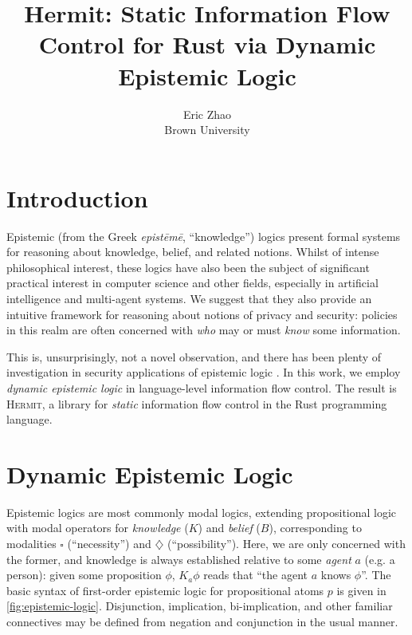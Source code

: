 \documentclass[letterpaper,twocolumn,10pt]{article}
\newcommand{\Hermit}{\textsc{Hermit}}
\begin{document}
\ActivateVerbatimLigatures

\date{}

\title{\Large \bf Hermit: Static Information Flow Control for Rust via Dynamic Epistemic Logic}

\author{
  {\rm Eric Zhao} \\
  Brown University
}

\maketitle

\section{Introduction}

Epistemic (from the Greek \emph{epistēmē}, ``knowledge'') logics present formal systems for reasoning about knowledge,
belief, and related notions. Whilst of intense philosophical interest, these logics have also been
the subject of significant practical interest in computer science and other fields, especially in
artificial intelligence and multi-agent systems. We suggest that they also provide an intuitive
framework for reasoning about notions of privacy and security: policies in this realm are often
concerned with \emph{who} may or must \emph{know} some information.

This is, unsurprisingly, not a novel observation, and there has been plenty of investigation in
security applications of epistemic logic \cite{aucher_2011a, dechesne_2010a, balliu_2011a,
koleini_2013a, soloviev_2024a}. In this work, we employ \emph{dynamic epistemic logic} in
language-level information flow control. The result is \Hermit{}, a library for \emph{static}
information flow control in the Rust programming language.

\section{Dynamic Epistemic Logic}
\label{sec:background-del}

Epistemic logics are most commonly modal logics, extending propositional logic with modal operators
for \emph{knowledge} (\(K\)) and \emph{belief} (\(B\)), corresponding to modalities \(\square\)
(``necessity'') and \(\diamondsuit\) (``possibility''). Here, we are only concerned with the former,
and knowledge is always established relative to some \emph{agent} \(a\) (e.g. a person): given some
proposition \(\phi\), \(K_a \phi\) reads that ``the agent \(a\) knows \(\phi\)''. The basic syntax
of first-order epistemic logic for propositional atoms \(p\) is given in \cref{fig:epistemic-logic}.
Disjunction, implication, bi-implication, and other familiar connectives may be defined from
negation and conjunction in the usual manner.
\end{document}
